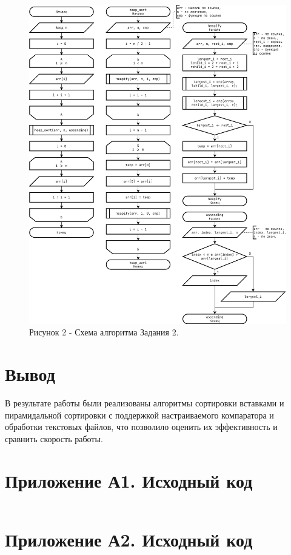 \documentclass[oneside,a4paper,14pt]{extarticle}
\begin{document}
\begin{figure}[!ht]
	\centering
	\includegraphics[height=0.9\textheight]{pics/flowchart2.png}
	\caption*{Рисунок 2 - Схема алгоритма Задания 2.}
\end{figure}

\section*{Вывод}


В результате работы были реализованы алгоритмы сортировки вставками и пирамидальной сортировки с поддержкой настраиваемого компаратора и обработки текстовых файлов, что позволило оценить их эффективность и сравнить скорость работы.
\newpage
\section*{Приложение А1. Исходный код}

\inputminted{C}{code/heap_sort.c}

\section*{Приложение А2. Исходный код}
\inputminted{C}{code/insertion_sort.c}
\end{document}
